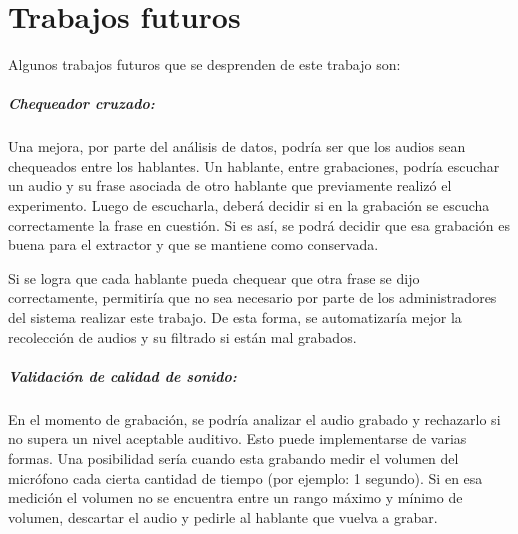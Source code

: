 \chapter{Trabajos futuros}

Algunos trabajos futuros que se desprenden de este trabajo son:



\paragraph*{Chequeador cruzado:} Una mejora, por parte del análisis de datos, podría ser que los audios sean chequeados entre los hablantes. Un hablante, entre grabaciones, podría escuchar un audio y su frase asociada de otro hablante que previamente realizó el experimento. Luego de escucharla, deberá decidir si en la grabación se escucha correctamente la frase en cuestión. Si es así, se podrá decidir que esa grabación es buena para el extractor y que se mantiene como conservada.

Si se logra que cada hablante pueda chequear que otra frase se dijo correctamente, permitiría que no sea necesario por parte de los administradores del sistema realizar este trabajo. De esta forma, se automatizaría mejor la recolección de audios y su filtrado si están mal grabados.

\paragraph*{Validación de calidad de sonido:} En el momento de grabación, se podría analizar el audio grabado y rechazarlo si no supera un nivel aceptable auditivo. Esto puede implementarse de varias formas. Una posibilidad sería cuando esta grabando medir el volumen del micrófono cada cierta cantidad de tiempo (por ejemplo: 1 segundo). Si en esa medición el volumen no se encuentra entre un rango máximo y mínimo de volumen, descartar el audio y pedirle al hablante que vuelva a grabar.

